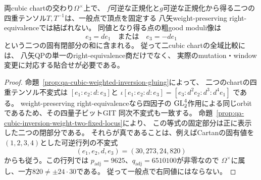 \begin{corollary}[二cubic正規化を貼る操作は一般には右同値でない]
\label{cor:qa-cubic-qp-inversion-not-right-equivalent}
両cubic chartの交わり$\Omega^\times$上で、
$f$可逆な正規化と$g$可逆な正規化から得る二つの
四重テンソル$T,T^{-1}$は、一般点で頂点を固定する
八矢weight-preserving right-equivalenceでは結ばれない。
同値となり得る点の粗good moduli像は
\[
 e_3=de_1\quad\text{または}\quad e_3=-de_1
 \tag{Fix}\label{eq:qa-cubic-qp-inversion-right-equivalence-locus}
\]
という二つの固有閉部分の和に含まれる。
従って二cubic chartの全域比較には、
八矢QPの単一のright-equivalence商だけでなく、
実際のmutation・window変更に対応する貼合せが必要である。
\end{corollary}
\begin{proof}
命題~\ref{prop:qa-cubic-weighted-inversion-gluing}によって、
二つのchartの四重テンソル不変式は
$[e_1:e_2:d:e_3]$と
$\iota[e_1:e_2:d:e_3]=[e_3:d^2e_2:d^3:d^4e_1]$
である。
weight-preserving right-equivalenceなら四因子の
$\operatorname{GL}_2^4$作用による同じorbitであるため、その四量子ビットGIT
同次不変式も一致する。
命題~\ref{prop:qa-cubic-inversion-weight-two-fixed-locus}により、
この等式の固定部分は正に表示した二つの閉部分である。
それらが真であることは、例えばCartanの固有値を
$(1,2,3,4)$とした可逆行列の不変式
\[
 (e_1,e_2,d,e_3)=(30,273,24,820)
\]
からも従う。この行列では
$p_{\mathrm{adj}}=9625$、$q_{\mathrm{adj}}=6510100$が非零なので
$\Omega^\times$に属し、一方$820\ne\pm24\cdot30$である。
従って一般点で右同値にはならない。
\end{proof}

